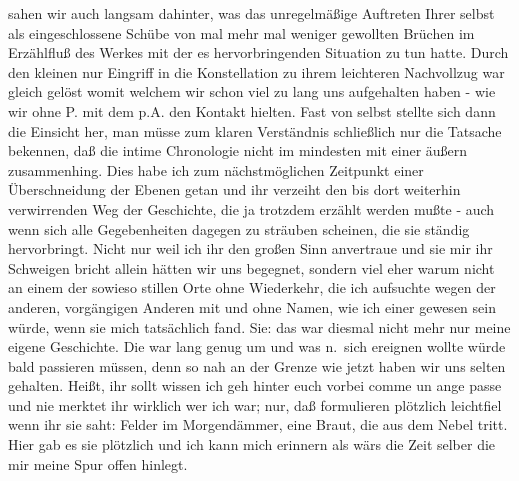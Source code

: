 \documentclass[
]{article}
\begin{document}
sahen wir auch langsam dahinter, was das unregelmäßige Auftreten Ihrer
selbst als eingeschlossene Schübe von mal mehr mal weniger gewollten
Brüchen im Erzählfluß des Werkes mit der es hervorbringenden Situation
zu tun hatte. Durch den kleinen nur Eingriff in die Konstellation zu
ihrem leichteren Nachvollzug war gleich gelöst womit welchem wir schon
viel zu lang uns aufgehalten haben - wie wir ohne P. mit dem p.A. den
Kontakt hielten. Fast von selbst stellte sich dann die Einsicht her, man
müsse zum klaren Verständnis schließlich nur die Tatsache bekennen, daß
die intime Chronologie nicht im mindesten mit einer äußern zusammenhing.
Dies habe ich zum nächstmöglichen Zeitpunkt einer Überschneidung der
Ebenen getan und ihr verzeiht den bis dort weiterhin verwirrenden Weg
der Geschichte, die ja trotzdem erzählt werden mußte - auch wenn sich
alle Gegebenheiten dagegen zu sträuben scheinen, die sie ständig
hervorbringt. Nicht nur weil ich ihr den großen Sinn anvertraue und sie
mir ihr Schweigen bricht allein hätten wir uns begegnet, sondern viel
eher warum nicht an einem der sowieso stillen Orte ohne Wiederkehr, die
ich aufsuchte wegen der anderen, vorgängigen Anderen mit und ohne Namen,
wie ich einer gewesen sein würde, wenn sie mich tatsächlich fand. Sie:
das war diesmal nicht mehr nur meine eigene Geschichte. Die war lang
genug um und was n.~sich ereignen wollte würde bald passieren müssen,
denn so nah an der Grenze wie jetzt haben wir uns selten gehalten.
Heißt, ihr sollt wissen ich geh hinter euch vorbei comme un ange passe
und nie merktet ihr wirklich wer ich war; nur, daß formulieren plötzlich
leichtfiel wenn ihr sie saht: Felder im Morgendämmer, eine Braut, die
aus dem Nebel tritt. Hier gab es sie plötzlich und ich kann mich
erinnern als wärs die Zeit selber die mir meine Spur offen hinlegt.
\end{document}
